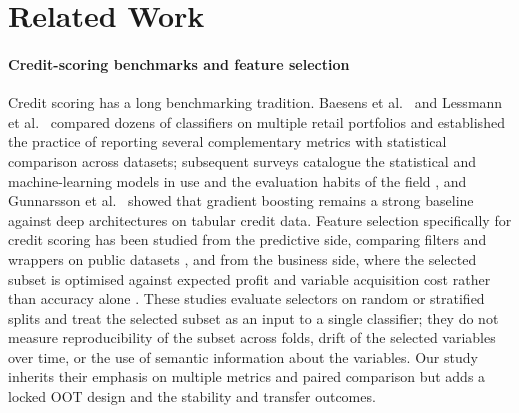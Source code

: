 \documentclass[preprint,12pt]{elsarticle}
\begin{document}
\section{Related Work}
\label{sec:related_work}

\paragraph{Credit-scoring benchmarks and feature selection}
Credit scoring has a long benchmarking tradition. Baesens et al.\ \cite{baesens2003} and Lessmann et al.\ \cite{lessmann2015} compared dozens of classifiers on multiple retail portfolios and established the practice of reporting several complementary metrics with statistical comparison across datasets; subsequent surveys catalogue the statistical and machine-learning models in use and the evaluation habits of the field \cite{louzada2016,dastile2020}, and Gunnarsson et al.\ \cite{gunnarsson2021} showed that gradient boosting remains a strong baseline against deep architectures on tabular credit data. Feature selection specifically for credit scoring has been studied from the predictive side, comparing filters and wrappers on public datasets \cite{laborda2021}, and from the business side, where the selected subset is optimised against expected profit and variable acquisition cost rather than accuracy alone \cite{maldonado2017,kozodoi2019}. These studies evaluate selectors on random or stratified splits and treat the selected subset as an input to a single classifier; they do not measure reproducibility of the subset across folds, drift of the selected variables over time, or the use of semantic information about the variables. Our study inherits their emphasis on multiple metrics and paired comparison but adds a locked OOT design and the stability and transfer outcomes.
\end{document}
